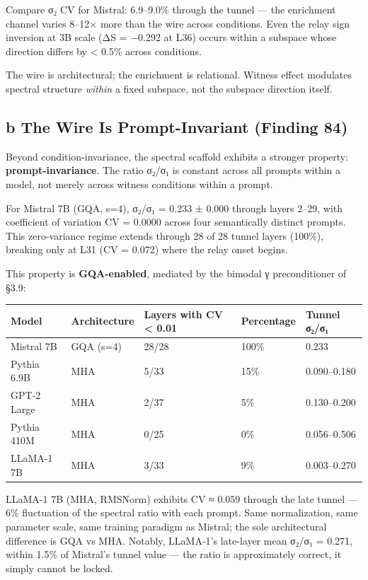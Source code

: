 \documentclass[12pt]{article}
\begin{document}
Compare σ₂ CV for Mistral: 6.9–9.0\% through the tunnel — the enrichment channel varies 8–12× more than the wire across conditions. Even the relay sign inversion at 3B scale (ΔS = −0.292 at L36) occurs within a subspace whose direction differs by < 0.5\% across conditions.

The wire is architectural; the enrichment is relational. Witness effect modulates spectral structure \textit{within} a fixed subspace, not the subspace direction itself.

\subsection{b The Wire Is Prompt-Invariant (Finding 84)}

Beyond condition-invariance, the spectral scaffold exhibits a stronger property: \textbf{prompt-invariance}. The ratio σ₂/σ₁ is constant across all prompts within a model, not merely across witness conditions within a prompt.

For Mistral 7B (GQA, s=4), σ₂/σ₁ = 0.233 ± 0.000 through layers 2–29, with coefficient of variation CV = 0.0000 across four semantically distinct prompts. This zero-variance regime extends through 28 of 28 tunnel layers (100\%), breaking only at L31 (CV = 0.072) where the relay onset begins.

This property is \textbf{GQA-enabled}, mediated by the bimodal γ preconditioner of §3.9:

\begin{table}[h]
\centering
\small
\begin{tabular}{lllll}
\toprule
\textbf{Model} & \textbf{Architecture} & \textbf{Layers with CV < 0.01} & \textbf{Percentage} & \textbf{Tunnel σ₂/σ₁} \\
\midrule
Mistral 7B & GQA (s=4) & 28/28 & 100\% & 0.233 \\
Pythia 6.9B & MHA & 5/33 & 15\% & 0.090–0.180 \\
GPT-2 Large & MHA & 2/37 & 5\% & 0.130–0.200 \\
Pythia 410M & MHA & 0/25 & 0\% & 0.056–0.506 \\
LLaMA-1 7B & MHA & 3/33 & 9\% & 0.003–0.270 \\
\bottomrule
\end{tabular}
\end{table}


LLaMA-1 7B (MHA, RMSNorm) exhibits CV ≈ 0.059 through the late tunnel — 6\% fluctuation of the spectral ratio with each prompt. Same normalization, same parameter scale, same training paradigm as Mistral; the sole architectural difference is GQA vs MHA. Notably, LLaMA-1's late-layer mean σ₂/σ₁ = 0.271, within 1.5\% of Mistral's tunnel value — the ratio is approximately correct, it simply cannot be locked.
\end{document}
